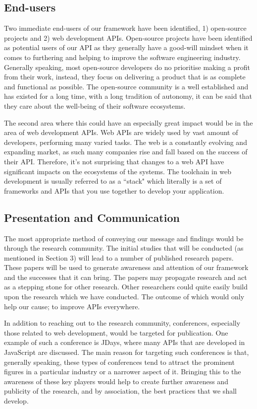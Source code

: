 \documentclass{article}
\begin{document}
\subsection{End-users}

Two immediate end-users of our framework have been identified, 1) open-source projects and 2) web development APIs. Open-source projects have been identified as potential users of our API as they generally have a good-will mindset when it comes to furthering and helping to improve the software engineering industry. Generally speaking, most open-source developers do no prioritise making a profit from their work, instead, they focus on delivering a product that is as complete and functional as possible. The open-source community is a well established and has existed for a long time, with a long tradition of autonomy, it can be said that they care about the well-being of their software ecosystems. \smallskip

The second area where this could have an especially great impact would be in the area of web development APIs. Web APIs are widely used by vast amount of developers, performing many varied tasks. The web is a constantly evolving and expanding market, as such many companies rise and fall based on the success of their API. Therefore, it's not surprising that changes to a web API have significant impacts on the ecosystems of the systems. The toolchain in web development is usually referred to as a ``stack" which literally is a set of frameworks and APIs that you use together to develop your application.

\subsection{Presentation and Communication}
The most appropriate method of conveying our message and findings would be through the research community. The initial studies that will be conducted (as mentioned in Section 3) will lead to a number of published research papers. These papers will be used to generate awareness and attention of our framework and the successes that it can bring. The papers may propagate research and act as a stepping stone for other research. Other researchers could quite easily build upon the research which we have conducted. The outcome of which would only help our cause; to improve APIs everywhere. \smallskip

In addition to reaching out to the research community, conferences, especially those related to web development, would be targeted for publication. One example of such a conference is JDays, where many APIs that are developed in JavaScript are discussed. The main reason for targeting such conferences is that, generally speaking, these types of conferences tend to attract the prominent figures in a particular industry or a narrower aspect of it. Bringing this to the awareness of these key players would help to create further awareness and publicity of the research, and by association, the best practices that we shall develop. \smallskip
\end{document}
